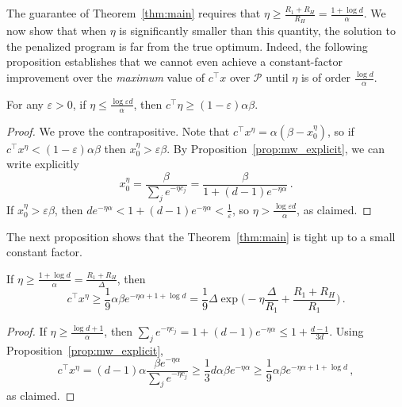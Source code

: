 \documentclass[final,12pt]{colt2018}
\newcommand{\cP}{\mathcal{P}}
\newcommand{\1}{\mathds{1}}
\newcommand*{\ep}{\varepsilon}
\begin{document}
The guarantee of Theorem~\ref{thm:main} requires that $\eta \geq \frac{R_1 + R_H}{R_H} = \frac{1+\log d}{\alpha}$.
We now show that when $\eta$ is significantly smaller than this quantity, the solution to the penalized program is far from the true optimum.
Indeed, the following proposition establishes that we cannot even achieve a constant-factor improvement over the \emph{maximum} value of $c^\top x$ over $\cP$ until $\eta$ is of order $\frac{\log d}{\alpha}$.

\begin{proposition}\label{prop:no_progress}
For any $\ep > 0$, if $\eta \leq \frac{\log \ep d}{\alpha}$, then $c^\top \eta \geq (1-\ep) \alpha \beta$.
\end{proposition}
\begin{proof}
We prove the contrapositive.
Note that $c^\top x^\eta = \alpha (\beta - x^\eta_0)$, so if $c^\top x^\eta < (1-\ep) \alpha \beta$ then $x^\eta_0 > \ep \beta$.
By Proposition~\ref{prop:mw_explicit}, we can write explicitly
\begin{equation*}
x^\eta_0 = \frac{\beta}{\sum_{j} e^{-\eta c_j}} = \frac{\beta}{1 + (d-1) e^{- \eta \alpha}}\,.
\end{equation*}
If $x^\eta_0 > \ep \beta$, then $d e^{-\eta \alpha} < 1 + (d-1) e^{-\eta \alpha} < \frac{1}{\ep}$, so $\eta > \frac{\log \ep d}{\alpha}$, as claimed.
\end{proof}

The next proposition shows that the Theorem~\ref{thm:main} is tight up to a small constant factor.
\begin{proposition}\label{prop:asymptotic_rate}
If $\eta \geq \frac{1 + \log d}{\alpha} = \frac{R_1 + R_H}{\Delta}$, then
\begin{equation*}
c^\top x^\eta \geq \frac{1}{9} \alpha \beta e^{- \eta \alpha + 1 + \log d} = \frac{1}{9} \Delta \exp\Big(-\eta \frac{\Delta}{R_1} + \frac{R_1 + R_H}{R_1}\Big)\,.
\end{equation*}
\end{proposition}
\begin{proof}
If $\eta \geq \frac{\log d + 1}{\alpha}$, then $\sum_j e^{-\eta c_j} = 1 + (d-1) e^{-\eta \alpha} \leq 1+\frac{d-1}{3 d}$.
Using Proposition~\ref{prop:mw_explicit},
\begin{equation*}
c^\top x^\eta = (d-1) \alpha \frac{\beta e^{- \eta \alpha}}{\sum_j e^{-\eta c_j}} \geq \frac 1 3 d \alpha \beta e^{-\eta \alpha} \geq \frac{1}{9} \alpha \beta e^{-\eta \alpha + 1 + \log d}\,,
\end{equation*}
as claimed.
\end{proof}
\end{document}
